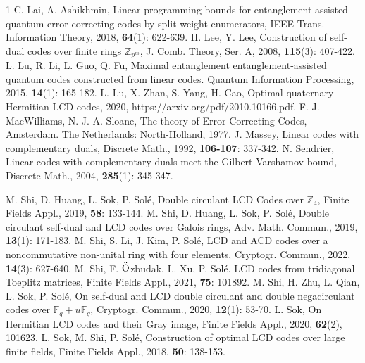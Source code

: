 \documentclass[12pt,twoside]{article}
\newcommand{\Z}{\mathbb{Z}}
\newcommand{\F}{\mathbb{F}}
\theoremstyle{plain}
\theoremstyle{definition}
\theoremstyle{remark}
\begin{document}
\begin{thebibliography}{1}
 C. Lai, A. Ashikhmin, Linear programming bounds for entanglement-assisted quantum error-correcting codes by split weight enumerators, IEEE Trans. Information Theory, 2018, {\bf64}(1): 622-639.
 H. Lee, Y. Lee, Construction of self-dual codes over finite rings $\Z_{p^m}$, J. Comb. Theory, Ser. A, 2008, {\bf 115}(3): 407-422.
     L. Lu, R. Li, L. Guo, Q. Fu, Maximal entanglement entanglement-assisted quantum codes constructed from linear codes. Quantum Information Processing, 2015, {\bf14}(1): 165-182.
     L. Lu, X. Zhan, S. Yang, H. Cao, Optimal quaternary Hermitian LCD codes, 2020, https://arxiv.org/pdf/2010.10166.pdf.
 F. J. MacWilliams, N. J. A. Sloane, The theory of Error Correcting Codes, Amsterdam. The Netherlands: North-Holland, 1977.
 J. Massey, Linear codes with complementary duals, Discrete Math., 1992, \textbf{106-107}: 337-342.
 N. Sendrier, Linear codes with complementary duals meet the Gilbert-Varshamov bound, Discrete Math., 2004, \textbf{285}(1): 345-347.

 M. Shi, D. Huang, L. Sok, P. Sol\'e, Double circulant LCD Codes over $\Z_4$, Finite Fields Appl., 2019, \textbf{58}: 133-144.
 M. Shi, D. Huang, L. Sok, P. Sol\'e, Double circulant self-dual and LCD codes over Galois rings, Adv. Math. Commun., 2019, {\bf13}(1): 171-183.
 M. Shi, S. Li, J. Kim, P. Sol\'e, LCD and ACD codes over a noncommutative non-unital ring with four elements, Cryptogr. Commun., 2022, {\bf14}(3): 627-640.
 M. Shi, F. $\ddot{{\rm O}}$zbudak, L. Xu, P. Sol\'e. LCD codes from tridiagonal Toeplitz matrices, Finite Fields Appl., 2021, \textbf{75}: 101892.
 M. Shi, H. Zhu, L. Qian, L. Sok, P. Sol\'e, On self-dual and LCD double circulant and double negacirculant codes over $\F_q + u\F_q$, Cryptogr. Commun., 2020, {\bf12}(1): 53-70.
 L. Sok, On Hermitian LCD codes and their Gray image, Finite Fields Appl., 2020, \textbf{62}(2), 101623.
 L. Sok, M. Shi, P. Sol\'e, Construction of optimal LCD codes over large finite fields, Finite Fields Appl., 2018, \textbf{50}: 138-153.
\end{thebibliography}
\end{document}
